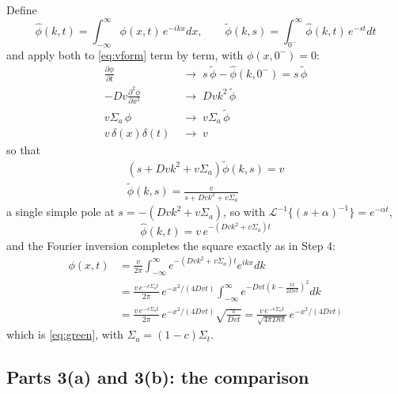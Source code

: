 \documentclass[11pt]{article}
\begin{document}
\begin{notebox}
Define
\begin{equation}
    \hat{\phi}(k,t) = \int_{-\infty}^{\infty}\phi(x,t)\,e^{-ikx}dx,
    \qquad
    \tilde{\phi}(k,s) = \int_{0^-}^{\infty}\hat{\phi}(k,t)\,e^{-st}dt
\end{equation}
and apply both to \eqref{eq:vform} term by term, with $\phi(x,0^-) = 0$:
\begin{align}
    \frac{\partial \phi}{\partial t} &\;\longrightarrow\; s\,\tilde{\phi} - \hat{\phi}(k,0^-) = s\,\tilde{\phi} \\
    -Dv\frac{\partial^2 \phi}{\partial x^2} &\;\longrightarrow\; Dvk^2\,\tilde{\phi} \\
    v\Sigma_a\,\phi &\;\longrightarrow\; v\Sigma_a\,\tilde{\phi} \\
    v\,\delta(x)\delta(t) &\;\longrightarrow\; v
\end{align}
so that
\begin{gather}
    \left(s + Dvk^2 + v\Sigma_a\right)\tilde{\phi}(k,s) = v \\
    \tilde{\phi}(k,s) = \frac{v}{s + Dvk^2 + v\Sigma_a}
\end{gather}
a single simple pole at $s = -(Dvk^2 + v\Sigma_a)$, so with
$\mathcal{L}^{-1}\{(s+\alpha)^{-1}\} = e^{-\alpha t}$,
\begin{equation}
    \hat{\phi}(k,t) = v\,e^{-\left(Dvk^2 + v\Sigma_a\right)t}
\end{equation}
and the Fourier inversion completes the square exactly as in Step 4:
\begin{align}
    \phi(x,t) &= \frac{v}{2\pi}\int_{-\infty}^{\infty} e^{-\left(Dvk^2 + v\Sigma_a\right)t}e^{ikx}dk \\
    &= \frac{v\,e^{-v\Sigma_a t}}{2\pi}\,e^{-x^2/(4Dvt)}\int_{-\infty}^{\infty} e^{-Dvt\left(k - \frac{ix}{2Dvt}\right)^2}dk \\
    &= \frac{v\,e^{-v\Sigma_a t}}{2\pi}\,e^{-x^2/(4Dvt)}\sqrt{\frac{\pi}{Dvt}}
     = \frac{v\,e^{-v\Sigma_a t}}{\sqrt{4\pi Dvt}}\,e^{-x^2/(4Dvt)}
\end{align}
which is \eqref{eq:green}, with $\Sigma_a = (1-c)\Sigma_t$.
\end{notebox}

\subsection*{Parts 3(a) and 3(b): the comparison}
\label{sec:comparison}
\end{document}
